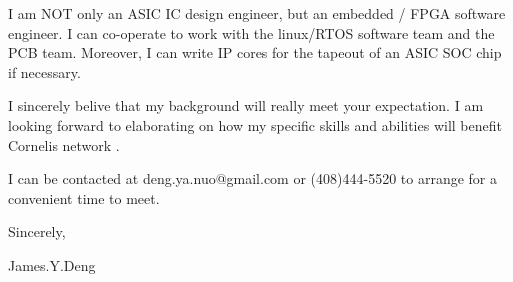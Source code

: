 { \bigbreak } 
I am NOT only an ASIC IC design engineer, but an embedded / FPGA software engineer. 
I can co-operate to work with the linux/RTOS software team and the PCB team.
Moreover, I can write IP cores for the tapeout of an ASIC SOC chip if necessary.

{ \bigbreak } 
I sincerely belive that my background will really meet your expectation.
I am looking forward to elaborating on how my specific skills and abilities will benefit Cornelis network .

{ \bigbreak } 
I can be contacted at deng.ya.nuo@gmail.com
or (408)444-5520 to arrange for a convenient time to meet.

{ \bigbreak } 




\vskip 60pt

{ \bigbreak } 
Sincerely,

James.Y.Deng

\bye
